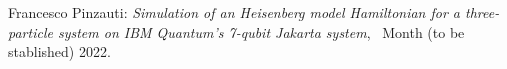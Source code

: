 \thispagestyle{empty}

\hfill

\vfill

\noindent Francesco Pinzauti: \textit{Simulation of an Heisenberg model Hamiltonian for a three-particle
system on IBM Quantum's 7-qubit Jakarta system}, \textcopyright\ Month (to be stablished) 2022.
